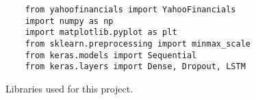 \clearpage
\begin{figure}
\centering
\begin{lstlisting}
    from yahoofinancials import YahooFinancials
    import numpy as np
    import matplotlib.pyplot as plt
    from sklearn.preprocessing import minmax_scale
    from keras.models import Sequential
    from keras.layers import Dense, Dropout, LSTM
\end{lstlisting}
\caption{Libraries used for this project.}
\label{fig:pseudocode:listings}
\end{figure}
